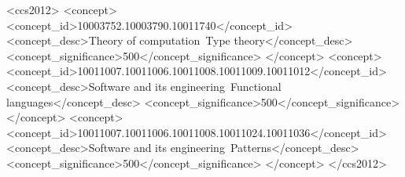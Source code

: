 \documentclass[acmsmall,screen]{acmart}\settopmatter{}
\theoremstyle{plain}
\begin{document}
\author{Eric Griffis}

\author{Hannah Potter}

\author{David Moon}

\author{Cyrus Omar}




\begin{CCSXML}
<ccs2012>
   <concept>
       <concept_id>10003752.10003790.10011740</concept_id>
       <concept_desc>Theory of computation~Type theory</concept_desc>
       <concept_significance>500</concept_significance>
       </concept>
   <concept>
       <concept_id>10011007.10011006.10011008.10011009.10011012</concept_id>
       <concept_desc>Software and its engineering~Functional languages</concept_desc>
       <concept_significance>500</concept_significance>
       </concept>
   <concept>
       <concept_id>10011007.10011006.10011008.10011024.10011036</concept_id>
       <concept_desc>Software and its engineering~Patterns</concept_desc>
       <concept_significance>500</concept_significance>
       </concept>
 </ccs2012>
\end{CCSXML}

\end{document}
